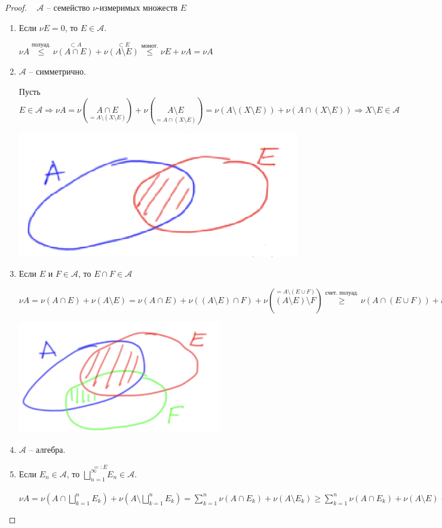 \begin{proof}~
    $\mathcal{A}$ – семейство $\nu$-измеримых множеств $E$

    \begin{enumerate}
        \item Если $\nu E=0$, то $E\in \mathcal{A}$.
        
        $\nu A \overset{\text{полуад.}}{\leq} \nu \overset{\subset A}{(A\cap E)}+\nu \overset{\subset E}{(A\setminus E)}\overset{\text{монот.}}{\leq} \nu E + \nu A = \nu A$

        \item $\mathcal{A}$ – симметрично.
        
        Пусть $E\in \mathcal{A}\Rightarrow \nu A = \nu (\underset{=A\setminus(X\setminus E)}{A\cap E})+\nu (\underset{=A\cap(X\setminus E)}{A\setminus E})=
        \nu (A\setminus(X\setminus E))+\nu (A\cap(X\setminus E))\Rightarrow X\setminus E\in \mathcal{A}$

        \includegraphics[width=0.2\linewidth]{images/23-09-14-2.png}

        \item Если $E$ и $F\in \mathcal{A}$, то $E\cap F \in \mathcal{A}$
        
        $\nu A = \nu (A\cap E)+\nu (A\setminus E)= \nu (A\cap E)+\nu ((A\setminus E)\cap F)+\nu (\overset{=A\setminus (E\cup F)}{(A\setminus E)\setminus F})\overset{\text{счет. полуад.}}{\geq} 
        \nu (A\cap(E\cup F))+\nu (A\setminus (E\cup F))$

        \includegraphics[width=0.2\linewidth]{images/23-09-14-3.png}

        \item $\mathcal{A}$ – алгебра.
        \item Если $E_n\in \mathcal{A}$, то $\overset{=:E}{\bigsqcup\limits_{n=1}^\infty E_n}\in \mathcal{A}$.
        
        $\nu A=\nu (A\cap \bigsqcup\limits_{k=1}^n E_k)+\nu (A\setminus \bigsqcup\limits_{k=1}^n E_k)=
        \sum \limits_{k=1}^n \nu(A\cap E_k) + \nu (A\setminus E_k)\geq
        \sum \limits_{k=1}^n \nu(A\cap E_k) + \nu (A\setminus E)\rightarrow
        \sum \limits_{k=1}^\infty \nu(A\cap E_k) + \nu (A\setminus E)\overset{\text{счет. полуад.}}{\geq} \nu (A\cap E) + \nu (A\setminus E)$


\end{enumerate}
\end{proof}
